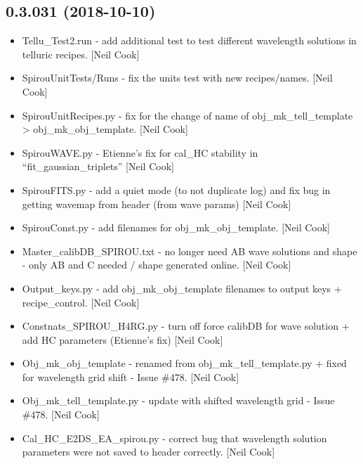 \documentclass[a4paper,10pt,english]{report}
\begin{document}
\subsection{0.3.031 (2018-10-10)}
\label{\detokenize{misc/changelog:id298}}\begin{itemize}
\item {} 
Tellu\_Test2.run - add additional test to test different wavelength
solutions in telluric recipes. {[}Neil Cook{]}

\item {} 
SpirouUnitTests/Runs - fix the units test with new recipes/names.
{[}Neil Cook{]}

\item {} 
SpirouUnitRecipes.py - fix for the change of name of
obj\_mk\_tell\_template \textendash{}\textgreater{} obj\_mk\_obj\_template. {[}Neil Cook{]}

\item {} 
SpirouWAVE.py - Etienne’s fix for cal\_HC stability in
“fit\_gaussian\_triplets” {[}Neil Cook{]}

\item {} 
SpirouFITS.py - add a quiet mode (to not duplicate log) and fix bug in
getting wavemap from header (from wave params) {[}Neil Cook{]}

\item {} 
SpirouConst.py - add filenames for obj\_mk\_obj\_template. {[}Neil Cook{]}

\item {} 
Master\_calibDB\_SPIROU.txt - no longer need AB wave solutions and shape
- only AB and C needed / shape generated online. {[}Neil Cook{]}

\item {} 
Output\_keys.py - add obj\_mk\_obj\_template filenames to output keys +
recipe\_control. {[}Neil Cook{]}

\item {} 
Constnats\_SPIROU\_H4RG.py - turn off force calibDB for wave solution +
add HC parameters (Etienne’s fix) {[}Neil Cook{]}

\item {} 
Obj\_mk\_obj\_template - renamed from obj\_mk\_tell\_template.py + fixed for
wavelength grid shift - Issue \#478. {[}Neil Cook{]}

\item {} 
Obj\_mk\_tell\_template.py - update with shifted wavelength grid - Issue
\#478. {[}Neil Cook{]}

\item {} 
Cal\_HC\_E2DS\_EA\_spirou.py - correct bug that wavelength solution
parameters were not saved to header correctly. {[}Neil Cook{]}


\end{itemize}
\end{document}
